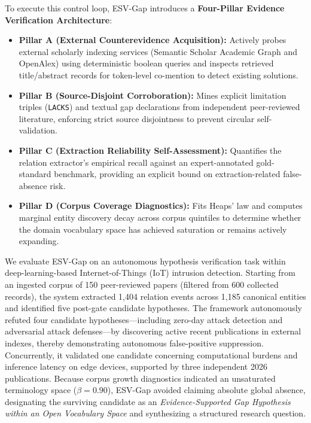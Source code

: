 \documentclass[conference,10pt]{IEEEtran}
\newcommand{\method}{ESV-Gap}
\begin{document}
To execute this control loop, \method{} introduces a \textbf{Four-Pillar Evidence Verification Architecture}:
\begin{itemize}[leftmargin=1.5em]
  \item \textbf{Pillar A (External Counterevidence Acquisition):} Actively probes external scholarly indexing services (Semantic Scholar Academic Graph and OpenAlex) using deterministic boolean queries and inspects retrieved title/abstract records for token-level co-mention to detect existing solutions.
  \item \textbf{Pillar B (Source-Disjoint Corroboration):} Mines explicit limitation triples (\texttt{LACKS}) and textual gap declarations from independent peer-reviewed literature, enforcing strict source disjointness to prevent circular self-validation.
  \item \textbf{Pillar C (Extraction Reliability Self-Assessment):} Quantifies the relation extractor's empirical recall against an expert-annotated gold-standard benchmark, providing an explicit bound on extraction-related false-absence risk.
  \item \textbf{Pillar D (Corpus Coverage Diagnostics):} Fits Heaps' law and computes marginal entity discovery decay across corpus quintiles to determine whether the domain vocabulary space has achieved saturation or remains actively expanding.
\end{itemize}

We evaluate \method{} on an autonomous hypothesis verification task within deep-learning-based Internet-of-Things (IoT) intrusion detection. Starting from an ingested corpus of 150 peer-reviewed papers (filtered from 600 collected records), the system extracted 1,404 relation events across 1,185 canonical entities and identified five post-gate candidate hypotheses. The framework autonomously refuted four candidate hypotheses---including zero-day attack detection and adversarial attack defenses---by discovering active recent publications in external indexes, thereby demonstrating autonomous false-positive suppression. Concurrently, it validated one candidate concerning computational burdens and inference latency on edge devices, supported by three independent 2026 publications. Because corpus growth diagnostics indicated an unsaturated terminology space ($\beta = 0.90$), \method{} avoided claiming absolute global absence, designating the surviving candidate as an \emph{Evidence-Supported Gap Hypothesis within an Open Vocabulary Space} and synthesizing a structured research question.
\end{document}
